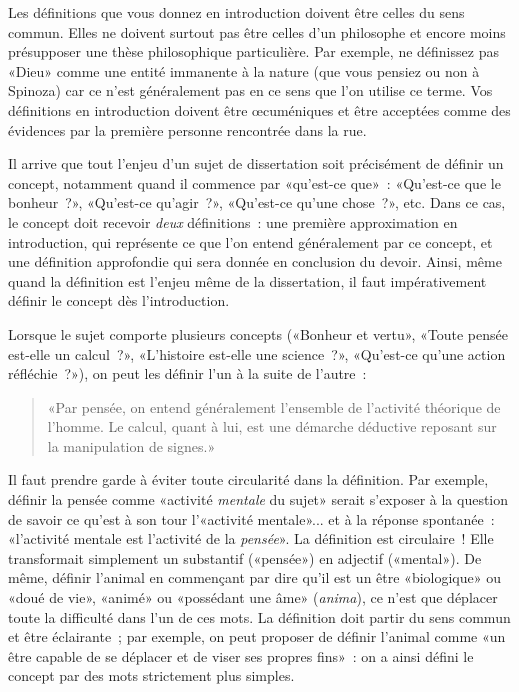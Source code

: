 \documentclass[a4paper,11pt]{article}
\begin{document}
\par

Les définitions que vous donnez en introduction doivent être celles du
sens commun. Elles ne doivent surtout pas être celles d'un philosophe et
encore moins présupposer une thèse philosophique particulière. Par
exemple, ne définissez pas «Dieu» comme une entité immanente à la nature
(que vous pensiez ou non à Spinoza) car ce n'est généralement pas en ce
sens que l'on utilise ce terme. Vos définitions en introduction doivent
être œcuméniques et être acceptées comme des évidences par la première
personne rencontrée dans la rue.

\par

Il arrive que tout l'enjeu d'un sujet de dissertation soit précisément
de définir un concept, notamment quand il commence par «qu'est-ce que»~:
«Qu'est-ce que le bonheur~?», «Qu'est-ce qu'agir~?», «Qu'est-ce qu'une
chose~?», etc. Dans ce cas, le concept doit recevoir \emph{deux}
définitions~: une première approximation en introduction, qui représente
ce que l'on entend généralement par ce concept, et une définition
approfondie qui sera donnée en conclusion du devoir. Ainsi, même quand
la définition est l'enjeu même de la dissertation, il faut
impérativement définir le concept dès l'introduction. 

\par

Lorsque le sujet comporte plusieurs concepts («Bonheur et vertu», «Toute
pensée est-elle un calcul~?», «L'histoire est-elle une science~?»,
«Qu'est-ce qu'une action réfléchie~?»), on peut les définir l'un à la
suite de l'autre~:

\begin{quote}
  «Par pensée, on entend généralement l'ensemble de l'activité théorique
  de l'homme. Le calcul, quant à lui, est une démarche déductive
  reposant sur la manipulation de signes.»
\end{quote}

Il faut prendre garde à éviter toute circularité dans la définition. Par
exemple, définir la pensée comme «activité \emph{mentale} du sujet»
serait s'exposer à la question de savoir ce qu'est à son tour
l'«activité mentale»... et à la réponse spontanée~: «l'activité mentale
est l'activité de la \emph{pensée}». La définition est circulaire~! Elle
transformait simplement un substantif («pensée») en adjectif («mental»).
De même, définir l'animal en commençant par dire qu'il est un être
«biologique» ou «doué de vie», «animé» ou «possédant une âme»
(\emph{anima}), ce n'est que déplacer toute la difficulté dans l'un de
ces mots. La définition doit partir du sens commun et être éclairante~;
par exemple, on peut proposer de définir l'animal comme «un être capable
de se déplacer et de viser ses propres fins»~: on a ainsi défini le
concept par des mots strictement plus simples.
\end{document}
